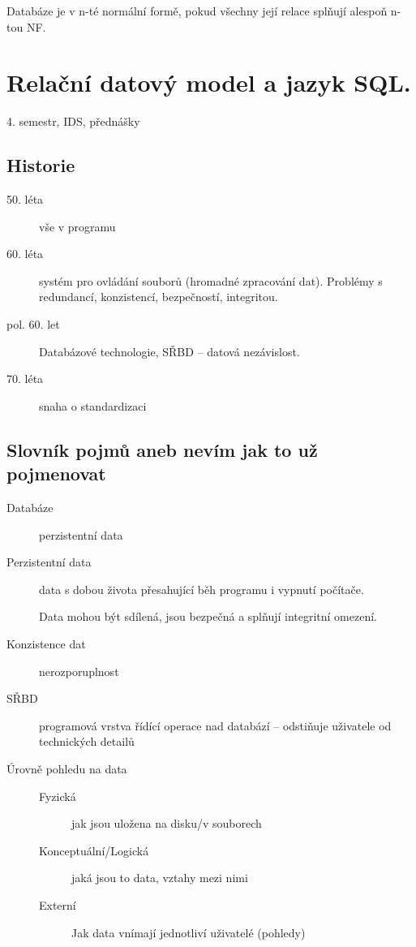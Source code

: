 \documentclass[a4paper, 11pt]{report}
\begin{document}
Databáze je v n-té normální formě, pokud všechny její relace splňují alespoň n-tou NF.
























\chapter{Relační datový model a jazyk SQL.} \label{cha:33}

4. semestr, IDS, přednášky

\section{Historie}
\begin{description}
	\item[50. léta] vše v programu
	\item[60. léta] systém pro ovládání souborů (hromadné zpracování dat). Problémy s redundancí, konzistencí, bezpečností, integritou.
	\item[pol. 60. let] Databázové technologie, SŘBD -- datová nezávislost.
	\item[70. léta] snaha o standardizaci
\end{description}

\section{Slovník pojmů aneb nevím jak to už pojmenovat}
\begin{description}
	\item[Databáze] perzistentní data
	\item[Perzistentní data] data s dobou života přesahující běh programu i vypnutí počítače.
	
	Data mohou být sdílená, jsou bezpečná a splňují integritní omezení.
	\item[Konzistence dat] nerozporuplnost
	\item[SŘBD] programová vrstva řídící operace nad databází -- odstiňuje uživatele od technických detailů
	\item[Úrovně pohledu na data]
	\begin{description}
		\item[Fyzická] jak jsou uložena na disku/v souborech
		\item[Konceptuální/Logická] jaká jsou to data, vztahy mezi nimi
		\item[Externí] Jak data vnímají jednotliví uživatelé (pohledy)
	\end{description}
\end{description}
\end{document}

